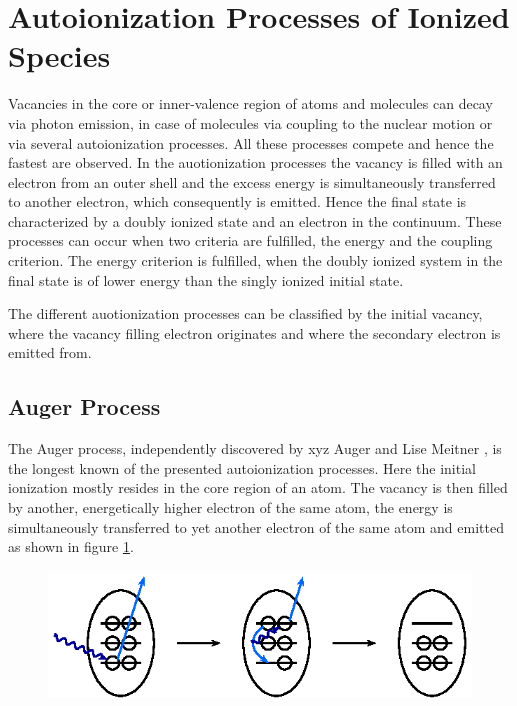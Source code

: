 \section{Autoionization Processes of Ionized Species}
Vacancies in the core or inner-valence region of atoms and molecules
can decay via photon emission, in case of molecules via coupling to
the nuclear motion or via several autoionization processes. All these
processes compete and hence the fastest are observed. In the auotionization
processes
the vacancy is filled with an electron from an outer shell and the excess
energy is simultaneously transferred to another electron, which consequently
is emitted. Hence the final state is characterized by a doubly ionized state
and an electron in the continuum. These processes can
occur when two criteria are fulfilled, the energy and the coupling criterion.
The energy criterion is fulfilled, when the doubly ionized system in the
final state is of lower energy than the singly ionized initial state.

The different auotionization processes can be classified by the initial
vacancy, where the
vacancy filling electron originates and where the secondary electron is
emitted from.

\subsection{Auger Process}
The Auger process, independently discovered by xyz Auger and Lise Meitner
\cite{}, is the longest known of the presented autoionization processes. Here
the initial ionization mostly resides in the core region of an atom. The vacancy
is then filled by another, energetically higher electron of the same atom, the
energy is simultaneously transferred to yet another electron of the same atom and
emitted as shown in figure \ref{figure:auger_process}.

\begin{figure}[h]
 \centering
 \includegraphics{pics/auger-pspic.eps}
 \caption{}
 \label{figure:auger_process}
\end{figure}


